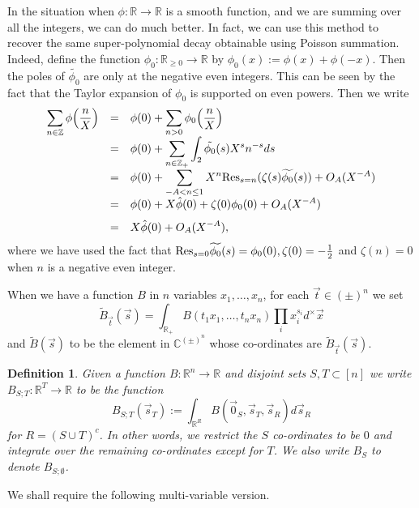 \documentclass{article}
\def\Z{{\mathbb Z}}
\def\ra{{\rightarrow}}
\def\Res{{\rm Res}}
\def\R{{\mathbb R}}
\def\Z{{\mathbb Z}}
\def\C{{\mathbb C}}
\def\wt{\widetilde}
\newtheorem{definition}[theorem]{Definition}
\begin{document}
In the situation when $\phi:\R\to\R$ is a smooth function, and we are summing over all the integers, we can do much better. In fact, we can use this method to recover the same super-polynomial decay obtainable using Poisson summation.
Indeed, define the function $\phi_0:\R_{\geq 0}\to \R$ by $\phi_0(x):=\phi(x)+\phi(-x)$. Then the poles of $\wt{\phi_0}$ are only at the negative even integers. This can be seen by the fact that the Taylor expansion of $\phi_0$ is supported on even powers. Then we write
\begin{equation*}
\begin{array}{rcl}
\displaystyle\sum_{n\in\Z}\phi\Bigl(\frac{n}{X}\Bigr) &=&\displaystyle \phi(0)+\sum_{n>0} \phi_0\Bigl(\frac{n}{X}\Bigr)
\\[.1in]&=&\displaystyle
\phi(0) + \sum_{n\in\Z_+}\int_{2} \tilde{\phi_0}(s)X^sn^{-s}ds
\\[.1in]&=&\displaystyle
\phi(0) + \sum_{-A<n\leq 1} X^n \textrm{Res}_{s=n} (\zeta(s)\wt{\phi_0}(s))+ O_A(X^{-A}) 
\\[.1in]&=&\displaystyle
\phi(0)+X\hat{\phi}(0) + \zeta(0)\phi_0(0) + O_A(X^{-A})
\\[.1in]&=&\displaystyle
X\hat{\phi}(0) + O_A(X^{-A}),
\end{array}
\end{equation*}
where we have used the fact that $\Res_{s=0}\wt{\phi_0}(s)=\phi_0(0),\zeta(0)=-\frac{1}{2}$ and $\zeta(n)=0$ when $n$ is a negative even integer.

\medskip



When we have a function $B$ in $n$ variables $x_1,\dots,x_n$, for each $\vec{t}\in(\pm)^n$ we set 
$$\tilde{B}_{\vec{t}}(\vec{s}) = \int_{\R_+} B(t_1x_1,\dots,t_nx_n)\prod_i x_i^{s_i} d^{\times}\vec{x}$$ and $\tilde{B}(\vec{s})$ to be the element in $\C^{(\pm)^n}$ whose co-ordinates are 
$\tilde{B}_{\vec{t}}(\vec{s})$.

\begin{definition}
Given a function $B:\R^n\ra \R$ and disjoint sets $S,T\subset [n]$ we write $B_{S;T}:\R^T\ra\R$ to be the function 
$$B_{S;T}(\vec s_T):=\int_{\R^R}B(\vec 0_S,\vec s_T,\vec s_R)d\vec s_R$$ for $R=(S\cup T)^c$. In other words, we restrict the $S$ co-ordinates to be $0$ and integrate over the remaining co-ordinates except for $T$. We also write
$B_S$ to denote $B_{S;\emptyset}$.
\end{definition}

We shall require the following multi-variable version.
\end{document}
